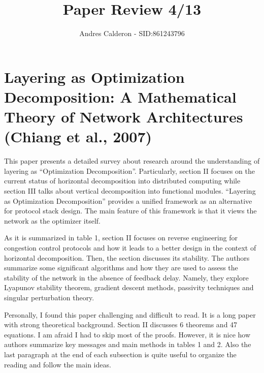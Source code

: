 \documentclass[a4paper,10pt]{scrartcl}
\title{Paper Review 4/13}
\author{Andres Calderon - SID:861243796}
\begin{document}
\maketitle
\thispagestyle{empty}

\section*{Layering as Optimization Decomposition: A Mathematical Theory of Network Architectures (Chiang et al., 2007)}
This paper presents a detailed survey about research around the understanding of layering as ``Optimization Decomposition''.  Particularly, section II focuses on the current status of horizontal decomposition into distributed computing while section III talks about vertical decomposition into functional modules.  ``Layering as Optimization Decomposition'' provides a unified framework as an alternative for protocol stack design. The main feature of this framework is that it views the network as the optimizer itself.

As it is summarized in table 1, section II focuses on reverse engineering for congestion control protocols and how it leads to a better design in the context of horizontal decomposition.  Then, the section discusses its stability.  The authors summarize some significant algorithms and how they are used to assess the stability of the network in the absence of feedback delay.  Namely, they explore Lyapunov stability theorem, gradient descent methods, passivity techniques and singular perturbation theory.

Personally, I found this paper challenging and difficult to read.  It is a long paper with strong theoretical background.  Section II discusses 6 theorems and 47 equations.  I am afraid I had to skip most of the proofs. However, it is nice how authors summarize key messages and main methods in tables 1 and 2.  Also the last paragraph at the end of each subsection is quite useful to organize the reading and follow the main ideas.

\end{document}
